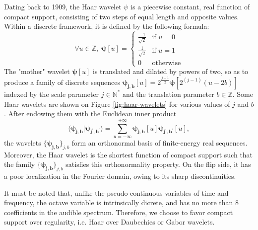 \documentclass{article}
\makeatletter
\newcommand*{\ie}{i.e.\@\xspace}
\makeatother
\begin{document}
Dating back to 1909, the Haar wavelet $\psi$ is a piecewise constant, real function of compact
support, consisting of two steps of equal length and opposite values.
Within a discrete framework,
it is defined by the following formula:
\begin{equation}
\forall u \in \mathbb{Z}, \;
\boldsymbol{\psi}[u] = \left\{ \begin{array}{cl}
\frac{-1}{\sqrt{2}} & \mbox{if }u = 0\\
\frac{1}{\sqrt{2}} & \mbox{if }u = 1\\
0 & \mbox{otherwise}
\end{array}\right.
\end{equation}
The "mother" wavelet $\boldsymbol{\psi}[u]$ is translated and dilated by powers of two, so as to
produce a family of discrete sequences
$\boldsymbol{\psi_{j,b}}[u] = 2^{\frac{j-1}{2}} \boldsymbol{\psi}[2^{(j-1)} (u - 2b)]$
indexed by the scale parameter $j \in \mathbb{N^*}$
and the translation parameter $b \in \mathbb{Z}$.
Some Haar wavelets are shown on Figure \ref{fig:haar-wavelets}
for various values of $j$ and $b$.
After endowing them with the Euclidean inner product
\begin{equation}
\langle \boldsymbol{\psi_{j,b}} \vert \boldsymbol{\psi_{j^\prime,b^\prime}} \rangle
 =
 \sum_{u = -\infty}^{+\infty}
 \boldsymbol{\psi_{j, b}}[u]
  \boldsymbol{\psi_{j^\prime,b^\prime}}[u],
\end{equation}
the wavelets $\{\boldsymbol{\psi_{j,b}}\}_{j,b}$ form an orthonormal basis of finite-energy
real sequences.
Moreover, the Haar wavelet is the shortest function of compact support such that the family
$\{\boldsymbol{\psi_{j,b}}\}_{j,b}$ satisfies this orthonormality property.
On the flip side, it has a poor localization in the Fourier domain, owing to its sharp discontinuities.

It must be noted that, unlike the pseudo-continuous variables of time and frequency,
the octave variable is intrinsically dicrete, and has no more than 8 coefficients in
the audible spectrum.
Therefore, we choose to favor compact support over regularity, \ie Haar over
Daubechies or Gabor wavelets.
\end{document}

